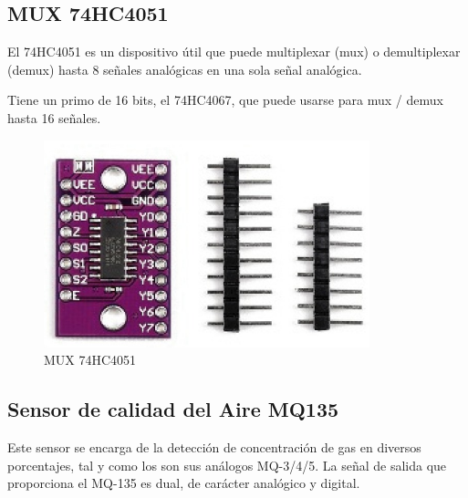 \documentclass[10pt,a4paper]{article}
\begin{document}
\begin{multicols}{2}
\begin{itemize}
\subsection{MUX 74HC4051}
El 74HC4051 es un dispositivo útil que puede multiplexar (mux) o demultiplexar (demux) hasta 8 señales analógicas en una sola señal analógica.

Tiene un primo de 16 bits, el 74HC4067, que puede usarse para mux / demux hasta 16 señales.


\begin{figure}[H]
\centering
\includegraphics[scale=0.65]{mux.PNG}
\caption{MUX 74HC4051}
\end{figure}



\subsection{Sensor de calidad del Aire MQ135}



Este sensor se encarga de la detección de concentración de gas en diversos porcentajes, tal y como los son sus análogos MQ-3/4/5. La señal de salida que proporciona el MQ-135 es dual, de carácter analógico y digital. 


\end{itemize}
\end{multicols}
\end{document}

